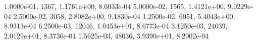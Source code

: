 1.0000e-01,  1367, 1.1761e+00, 8.6033e-04
5.0000e-02,  1565, 1.4121e+00, 9.0229e-04
2.5000e-02,  3058, 2.8082e+00, 9.1830e-04
1.2500e-02,  6051, 5.4043e+00, 8.9313e-04
6.2500e-03, 12046, 1.0453e+01, 8.6773e-04
3.1250e-03, 24039, 2.0129e+01, 8.3736e-04
1.5625e-03, 48036, 3.9390e+01, 8.2002e-04
